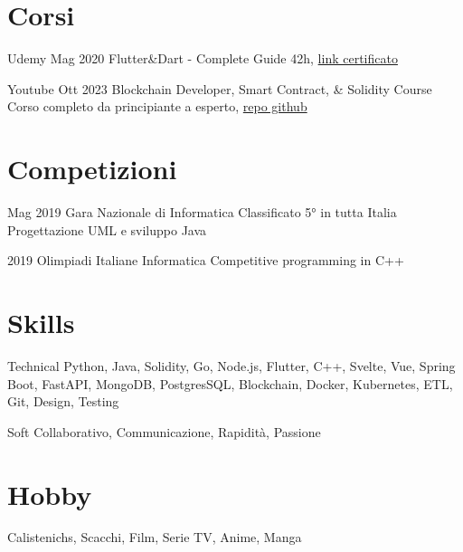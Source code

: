 \documentclass{tccv}
\begin{document}
\section{Corsi}

\begin{yearlist}

\item[Udemy]{Mag 2020}
     {Flutter\&Dart - Complete Guide}
     {42h, \href{https://www.udemy.com/certificate/UC-c6f5a32f-babc-42f9-8a0a-6effadf9e7cd/}{link certificato}}

\item[Youtube]{Ott 2023}
    {Blockchain Developer, Smart Contract, \& Solidity Course}
    {Corso completo da principiante a esperto, \href{https://github.com/Cyfrin/foundry-full-course-f23}{repo github}}

\end{yearlist}


\section{Competizioni}

\begin{yearlist}

\item[]{Mag 2019}
     {Gara Nazionale di Informatica}
     {Classificato 5° in tutta Italia \newline
     Progettazione UML e sviluppo Java}

\item[]{2019}
    {Olimpiadi Italiane Informatica}
    {Competitive programming in C++}

\end{yearlist}


\section{Skills}

\begin{factlist}

\item{Technical}
     {Python, Java, Solidity, Go, Node.js, Flutter, C++, Svelte, Vue, Spring Boot, FastAPI, MongoDB, PostgresSQL, Blockchain, Docker, Kubernetes, ETL, Git, Design, Testing}

\item{Soft}
     {Collaborativo, Communicazione, Rapidità, Passione}

\end{factlist}


\section{Hobby}

Calistenichs, Scacchi, Film, Serie TV, Anime, Manga
\end{document}
